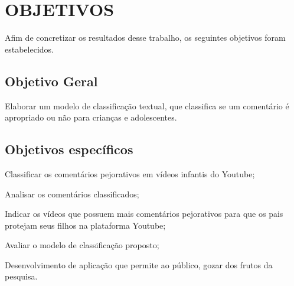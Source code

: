 \section{OBJETIVOS}

Afim de concretizar os resultados desse trabalho, os seguintes objetivos foram estabelecidos.

\subsection{Objetivo Geral}

Elaborar um modelo de classificação textual, que classifica se um comentário é apropriado ou não para crianças e adolescentes.

\begin{comment}
Example inline comment
\end{comment}

\subsection{Objetivos específicos}

\begin{alineas}
    
    \item Classificar os comentários pejorativos em vídeos infantis do Youtube;
    \item Analisar os comentários classificados;
    \item Indicar os vídeos que possuem mais comentários pejorativos para que os pais protejam seus filhos na plataforma Youtube; 
    \item Avaliar o modelo de classificação proposto;
    \item Desenvolvimento de aplicação que permite ao público, gozar dos frutos da pesquisa.
    
\end{alineas}
